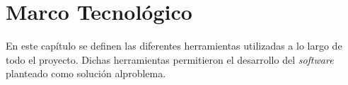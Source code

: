 \chapter{Marco Tecnológico} \label{chap:Marco Tecnologico}
En este capítulo se definen las diferentes herramientas utilizadas a lo largo de todo el proyecto. Dichas herramientas permitieron el desarrollo del \textit{software} planteado como solución alproblema.
\vspace{5 mm}


